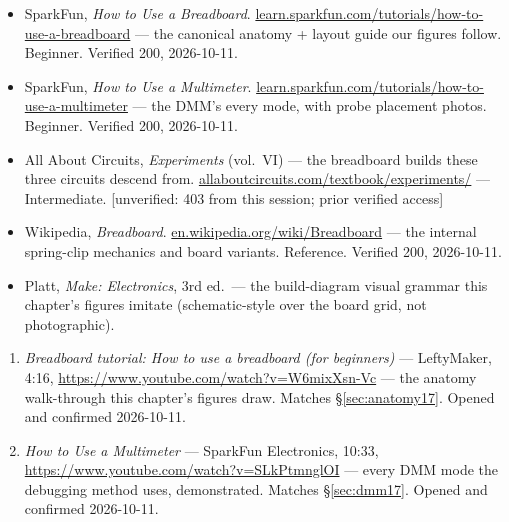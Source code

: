\begin{itemize}
\item SparkFun, \emph{How to Use a Breadboard}.\newline
\url{learn.sparkfun.com/tutorials/how-to-use-a-breadboard} ---
the canonical anatomy + layout guide our figures follow. Beginner.
Verified 200, 2026-10-11.
\item SparkFun, \emph{How to Use a Multimeter}.\newline
\url{learn.sparkfun.com/tutorials/how-to-use-a-multimeter} ---
the DMM's every mode, with probe placement photos. Beginner.
Verified 200, 2026-10-11.
\item All About Circuits, \emph{Experiments} (vol.~VI) --- the
breadboard builds these three circuits descend from.\newline
\url{allaboutcircuits.com/textbook/experiments/} --- Intermediate.
[unverified: 403 from this session; prior verified access]
\item Wikipedia, \emph{Breadboard}.\newline
\url{en.wikipedia.org/wiki/Breadboard} --- the internal spring-clip
mechanics and board variants. Reference. Verified 200, 2026-10-11.
\item Platt, \emph{Make: Electronics}, 3rd ed.\ --- the build-diagram
visual grammar this chapter's figures imitate (schematic-style over
the board grid, not photographic).
\end{itemize}

\begin{rulebox}
\begin{enumerate}
\item \emph{Breadboard tutorial: How to use a breadboard (for
beginners)} --- LeftyMaker, 4:16,
\url{https://www.youtube.com/watch?v=W6mixXsn-Vc} --- the anatomy
walk-through this chapter's figures draw. Matches
\S\ref{sec:anatomy17}. Opened and confirmed 2026-10-11.
\item \emph{How to Use a Multimeter} --- SparkFun Electronics,
10:33, \url{https://www.youtube.com/watch?v=SLkPtmnglOI} --- every
DMM mode the debugging method uses, demonstrated. Matches
\S\ref{sec:dmm17}. Opened and confirmed 2026-10-11.
\end{enumerate}
\end{rulebox}


